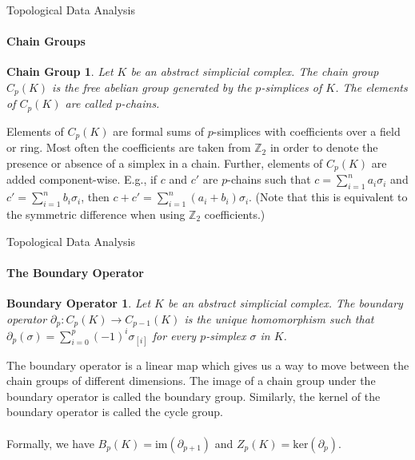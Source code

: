 \documentclass[pdf]{beamer}
\begin{document}
    \begin{frame}{Topological Data Analysis}
        \framesubtitle{Chain Groups}
        \newtheorem{defn:chain}{Chain Group}

        \begin{defn:chain}
            Let $K$ be an abstract simplicial complex. The {\color{red} chain group} $C_p(K)$ is the free abelian group
            generated by the $p$-simplices of $K$. The elements of $C_p(K)$ are called {\color{red} $p$-chains}.
        \end{defn:chain}

        Elements of $C_p(K)$ are formal sums of $p$-simplices with coefficients over a field or ring. Most 
        often the coefficients are taken from $\mathbb{Z}_2$ in order to denote the presence or absence of a
        simplex in a chain. Further, elements of $C_p(K)$ are added component-wise. E.g., if $c$ and $c'$
        are $p$-chains such that $c = \sum_{i=1}^n a_i \sigma_i$ and $c' = \sum_{i=1}^n b_i \sigma_i$, then
        $c + c' = \sum_{i=1}^n (a_i + b_i) \sigma_i$. (Note that this is equivalent to the symmetric difference
        when using $\mathbb{Z}_2$ coefficients.)
    \end{frame}

    \begin{frame}{Topological Data Analysis}
        \framesubtitle{The Boundary Operator}
        \newtheorem{defn:bop}{Boundary Operator}

        \begin{defn:bop}
            Let $K$ be an abstract simplicial complex. The {\color{red} boundary operator} $\partial_p : C_p(K) \to C_{p-1}(K)$
            is the unique homomorphism such that $\partial_p(\sigma) = \sum_{i=0}^p (-1)^i \sigma_{[i]}$ for every
            $p$-simplex $\sigma$ in $K$.
        \end{defn:bop}

        The boundary operator is a linear map which gives us a way to move between the chain groups of different
        dimensions. The image of a chain group under the boundary operator is called the {\color{red} boundary group}.
        Similarly, the kernel of the boundary operator is called the {\color{red} cycle group}. \\~\\

        Formally, we have $B_p(K) = \text{im}(\partial_{p+1})$ and $Z_p(K) = \text{ker}(\partial_p)$.
    \end{frame}
\end{document}
